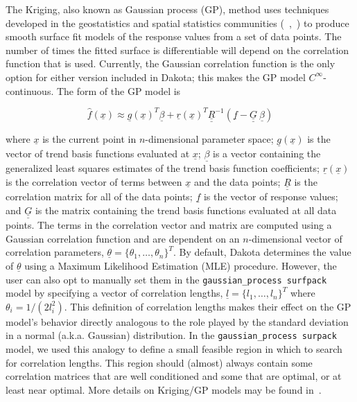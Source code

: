 The Kriging, also known as Gaussian process (GP), method uses techniques 
developed in the geostatistics and spatial statistics communities 
(~\cite{Cre91},~\cite{Koe96}) to produce smooth surface fit models of the 
response values from a set of data points.  The number of times the 
fitted surface is differentiable will depend on the correlation function 
that is used.  Currently, the Gaussian correlation function is the only 
option for either version included in Dakota; this makes the GP model 
$C^{\infty}$-continuous.  The form of the GP model is

\begin{equation}
  \hat{f}(\underline{x}) \approx \underline{g}(\underline{x})^T\underline{\beta} +
  \underline{r}(\underline{x})^{T}\underline{\underline{R}}^{-1}(\underline{f}-\underline{\underline{G}}\ \underline{\beta})
  \label{models:surf:equation08}
\end{equation}

where $\underline{x}$ is the current point in $n$-dimensional parameter
space; $\underline{g}(\underline{x})$ is the vector of trend basis 
functions evaluated at $\underline{x}$; $\underline{\beta}$ is a vector
containing the generalized least squares estimates of the trend basis 
function coefficients; $\underline{r}(\underline{x})$ is the correlation 
vector of terms between $\underline{x}$ and the data points;
$\underline{\underline{R}}$ is the correlation matrix for all of the 
data points; $\underline{f}$ is the vector of response values; and 
$\underline{\underline{G}}$ is the matrix containing the trend basis 
functions evaluated at all data points.  The terms in the correlation 
vector and matrix are computed using a Gaussian correlation function 
and are dependent on an $n$-dimensional vector of correlation parameters,
$\underline{\theta} = \{\theta_{1},\ldots,\theta_{n}\}^T$. By default, 
Dakota determines the value of $\underline{\theta}$ using a Maximum
Likelihood Estimation (MLE) procedure.  However, the user can also opt 
to manually set them in the \texttt{gaussian\_process surfpack}
model by specifying a vector of correlation lengths, 
$\underline{l}=\{l_{1},\ldots,l_{n}\}^T$ where 
$\theta_i=1/(2 l_i^2)$. This definition of correlation lengths makes 
their effect on the GP model's behavior directly analogous to the 
role played by the standard deviation in a normal (a.k.a. Gaussian) 
distribution.  In the \texttt{gaussian\_process surpack} model, we used 
this analogy to define a small feasible region in which to search for 
correlation lengths.  This region should (almost) always contain some 
correlation matrices that are well conditioned and some that are optimal, 
or at least near optimal. More details on Kriging/GP models may be 
found in~\cite{Giu98}.

